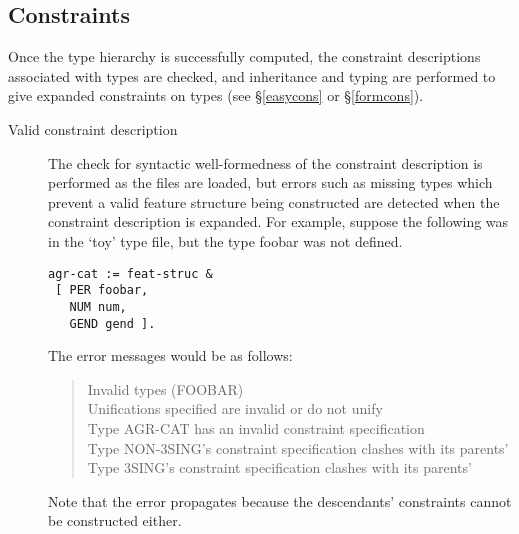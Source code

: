 \documentclass[12pt]{report}
\newenvironment{error}%
{\begin{quote}
\tt
}%
{\end{quote}
}
\begin{document}
\subsection{Constraints}
Once the type hierarchy is successfully computed, the constraint descriptions
associated with types are checked, and inheritance
and typing are performed to give expanded constraints on types
(see \S\ref{easycons} or \S\ref{formcons}).
\begin{description}
\item[Valid constraint description]
The check for syntactic well-formedness of the constraint description
is performed as the files are loaded, but errors such as 
missing types which prevent a valid feature structure being constructed
are detected when the constraint description is expanded.
For example, suppose the following was in the 
`toy' type file, but the type 
{\type foobar} was not defined.
\begin{verbatim}
agr-cat := feat-struc &
 [ PER foobar,
   NUM num,
   GEND gend ].
\end{verbatim}
The error messages would be as follows:
\begin{error}
Invalid types (FOOBAR)\\
Unifications specified are invalid or do not unify\\
Type AGR-CAT has an invalid constraint specification\\
Type NON-3SING's constraint specification clashes with its parents'\\
Type 3SING's constraint specification clashes with its parents'\\
\end{error}
Note that the error propagates because the descendants'
constraints cannot
be constructed either.


\end{description}
\end{document}
